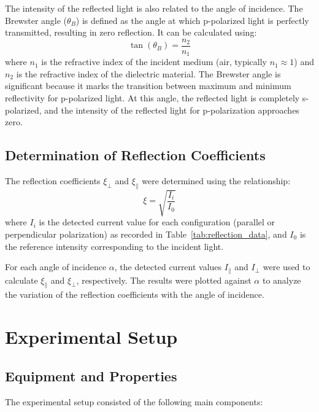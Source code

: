\documentclass[journal]{IEEEtran}
\begin{document}
The intensity of the reflected light is also related to the angle of incidence. The Brewster angle ($\theta_B$) is defined as the angle at which p-polarized light is perfectly transmitted, resulting in zero reflection. It can be calculated using:
\begin{equation}
    \tan(\theta_B) = \frac{n_2}{n_1}
\end{equation}
where $n_1$ is the refractive index of the incident medium (air, typically $n_1 \approx 1$) and $n_2$ is the refractive index of the dielectric material.
The Brewster angle is significant because it marks the transition between maximum and minimum reflectivity for p-polarized light. At this angle, the reflected light is completely s-polarized, and the intensity of the reflected light for p-polarization approaches zero.

\subsection{Determination of Reflection Coefficients}
The reflection coefficients $\xi_{\perp}$ and $\xi_{\parallel}$ were determined using the relationship:
\begin{equation}
    \xi = \sqrt{\frac{I_i}{I_0}}
\end{equation}
where $I_i$ is the detected current value for each configuration (parallel or perpendicular polarization) as recorded in Table~\ref{tab:reflection_data}, and $I_0$ is the reference intensity corresponding to the incident light.

For each angle of incidence $\alpha$, the detected current values $I_{\parallel}$ and $I_{\perp}$ were used to calculate $\xi_{\parallel}$ and $\xi_{\perp}$, respectively. The results were plotted against $\alpha$ to analyze the variation of the reflection coefficients with the angle of incidence.
\section{Experimental Setup}
\subsection{Equipment and Properties}
The experimental setup consisted of the following main components:
\end{document}
